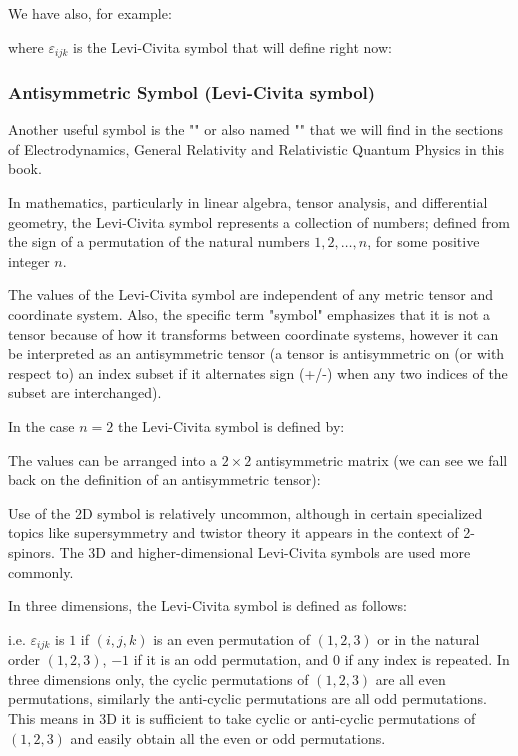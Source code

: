 	We have also, for example:
	
	where $\varepsilon_{ijk}$ is the Levi-Civita symbol that will define right now:
	
	\subsubsection{Antisymmetric Symbol (Levi-Civita symbol)}\label{levi civita symbol}
	Another useful symbol is the "" or also named "" that we will find in the sections of Electrodynamics,  General Relativity and Relativistic Quantum Physics in this book.
	
	In mathematics, particularly in linear algebra, tensor analysis, and differential geometry, the Levi-Civita symbol represents a collection of numbers; defined from the sign of a permutation of the natural numbers $1, 2, \ldots, n$, for some positive integer $n$.
	
		 The values of the Levi-Civita symbol are independent of any metric tensor and coordinate system. Also, the specific term "symbol" emphasizes that it is not a tensor because of how it transforms between coordinate systems, however it can be interpreted as an antisymmetric tensor (a tensor is antisymmetric on (or with respect to) an index subset if it alternates sign (+/-) when any two indices of the subset are interchanged).
	 
	 In the case $n=2$ the Levi-Civita symbol is defined by:
	 
	The values can be arranged into a $2\times 2$ antisymmetric matrix (we can see we fall back on the definition of an antisymmetric tensor):
	
	Use of the 2D symbol is relatively uncommon, although in certain specialized topics like supersymmetry and twistor theory it appears in the context of 2-spinors. The 3D and higher-dimensional Levi-Civita symbols are used more commonly.
	
	In three dimensions, the Levi-Civita symbol is defined as follows:
	
	i.e.  $\varepsilon_{ijk}$  is $1$ if $(i, j, k)$ is an even permutation of $(1,2,3)$ or in the natural order $(1,2,3)$, $-1$ if it is an odd permutation, and $0$ if any index is repeated. In three dimensions only, the cyclic permutations of $(1,2,3)$ are all even permutations, similarly the anti-cyclic permutations are all odd permutations. This means in 3D it is sufficient to take cyclic or anti-cyclic permutations of $(1,2,3)$ and easily obtain all the even or odd permutations.

